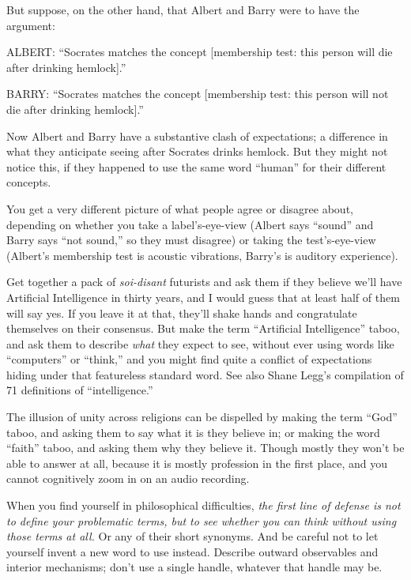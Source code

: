 {
 But suppose, on the other hand, that Albert and Barry were to have
the argument:}

{
 ALBERT: ``Socrates matches the concept
[membership test: this person will die after drinking
hemlock].''}

{
 BARRY: ``Socrates matches the concept [membership
test: this person will not die after drinking
hemlock].''}

{
 Now Albert and Barry have a substantive clash of expectations; a
difference in what they anticipate seeing after Socrates drinks
hemlock. But they might not notice this, if they happened to use the
same word ``human'' for their
different concepts.}

{
 You get a very different picture of what people agree or disagree
about, depending on whether you take a label's-eye-view
(Albert says ``sound'' and Barry
says ``not sound,'' so they must
disagree) or taking the test's-eye-view
(Albert's membership test is acoustic vibrations,
Barry's is auditory experience).}

{
 Get together a pack of \textit{soi-disant} futurists and ask them
if they believe we'll have Artificial Intelligence in
thirty years, and I would guess that at least half of them will say
yes. If you leave it at that, they'll shake hands and
congratulate themselves on their consensus. But make the term
``Artificial Intelligence'' taboo,
and ask them to describe \textit{what} they expect to see, without ever
using words like ``computers'' or
``think,'' and you might find quite
a conflict of expectations hiding under that featureless standard word.
See also Shane Legg's compilation of 71 definitions of
``intelligence.''}

{
 The illusion of unity across religions can be dispelled by making
the term ``God'' taboo, and asking
them to say what it is they believe in; or making the word
``faith'' taboo, and asking them why
they believe it. Though mostly they won't be able to
answer at all, because it is mostly profession in the first place, and
you cannot cognitively zoom in on an audio recording.}

{
 When you find yourself in philosophical difficulties, \textit{the
first line of defense is not to define your problematic terms, but to
see whether you can think without using those terms at all.} Or any of
their short synonyms. And be careful not to let yourself invent a new
word to use instead. Describe outward observables and interior
mechanisms; don't use a single handle, whatever that
handle may be.}


